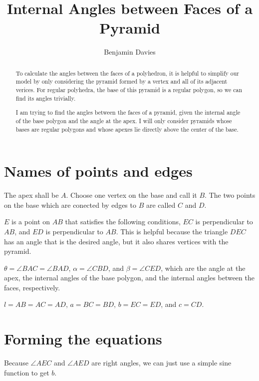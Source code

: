 \documentclass[a4paper]{article}
\begin{document}
  \title{Internal Angles between Faces of a Pyramid}
  \author{Benjamin Davies}
  \maketitle

  \begin{abstract}
    
    To calculate the angles between the faces of a polyhedron, it is helpful to simplify our model by only considering the pyramid formed by a vertex and all of its adjacent verices. For regular polyhedra, the base of this pyramid is a regular polygon, so we can find its angles trivially.

    I am trying to find the angles between the faces of a pyramid, given the internal angle of the base polygon and the angle at the apex. I will only consider pyramids whose bases are regular polygons and whose apexes lie directly above the center of the base.

  \end{abstract}

  \section{Names of points and edges}

  The apex shall be $A$. Choose one vertex on the base and call it $B$. The two points on the base which are conected by edges to $B$ are called $C$ and $D$.

  $E$ is a point on $AB$ that satisfies the following conditions, $EC$ is perpendicular to $AB$, and $ED$ is perpendicular to $AB$. This is helpful because the triangle $DEC$ has an angle that is the desired angle, but it also shares vertices with the pyramid.

  $\theta = \angle{BAC} = \angle{BAD}$, $\alpha = \angle{CBD}$, and $\beta = \angle{CED}$, which are the angle at the apex, the internal angles of the base polygon, and the internal angles between the faces, respectively.

  $l = AB = AC = AD$, $a = BC = BD$, $b = EC = ED$, and $c = CD$.

  \section{Forming the equations}

  Because $\angle{AEC}$ and $\angle{AED}$ are right angles, we can just use a simple sine function to get $b$.
\end{document}
